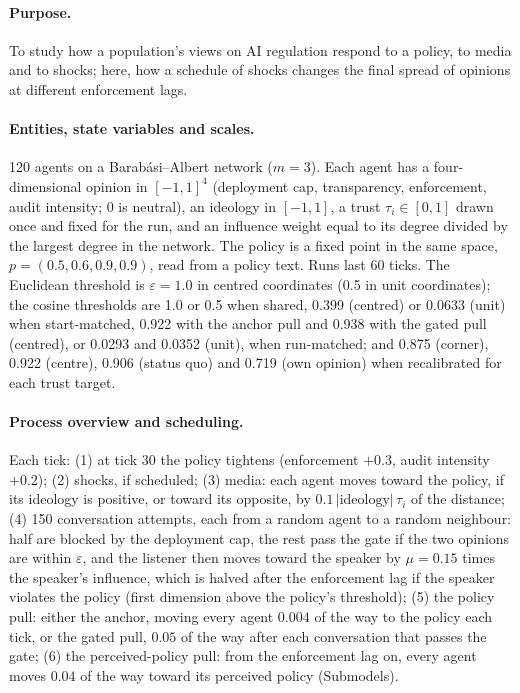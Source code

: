 \documentclass[11pt]{article}
\begin{document}
\paragraph{Purpose.} To study how a population's views on AI regulation respond to a policy, to media and to shocks; here, how a schedule of shocks changes the final spread of opinions at different enforcement lags.

\paragraph{Entities, state variables and scales.} 120 agents on a Barab\'asi--Albert network ($m=3$). Each agent has a four-dimensional opinion in $[-1,1]^4$ (deployment cap, transparency, enforcement, audit intensity; 0 is neutral), an ideology in $[-1,1]$, a trust $\tau_i \in [0,1]$ drawn once and fixed for the run, and an influence weight equal to its degree divided by the largest degree in the network. The policy is a fixed point in the same space, $p = (0.5, 0.6, 0.9, 0.9)$, read from a policy text. Runs last 60 ticks. The Euclidean threshold is $\varepsilon = 1.0$ in centred coordinates (0.5 in unit coordinates); the cosine thresholds are 1.0 or 0.5 when shared, 0.399 (centred) or 0.0633 (unit) when start-matched, 0.922 with the anchor pull and 0.938 with the gated pull (centred), or 0.0293 and 0.0352 (unit), when run-matched; and 0.875 (corner), 0.922 (centre), 0.906 (status quo) and 0.719 (own opinion) when recalibrated for each trust target.

\paragraph{Process overview and scheduling.} Each tick: (1) at tick 30 the policy tightens (enforcement $+0.3$, audit intensity $+0.2$); (2) shocks, if scheduled; (3) media: each agent moves toward the policy, if its ideology is positive, or toward its opposite, by $0.1\,|\text{ideology}|\,\tau_i$ of the distance; (4) 150 conversation attempts, each from a random agent to a random neighbour: half are blocked by the deployment cap, the rest pass the gate if the two opinions are within $\varepsilon$, and the listener then moves toward the speaker by $\mu = 0.15$ times the speaker's influence, which is halved after the enforcement lag if the speaker violates the policy (first dimension above the policy's threshold); (5) the policy pull: either the anchor, moving every agent $0.004$ of the way to the policy each tick, or the gated pull, $0.05$ of the way after each conversation that passes the gate; (6) the perceived-policy pull: from the enforcement lag on, every agent moves $0.04$ of the way toward its perceived policy (Submodels).
\end{document}
